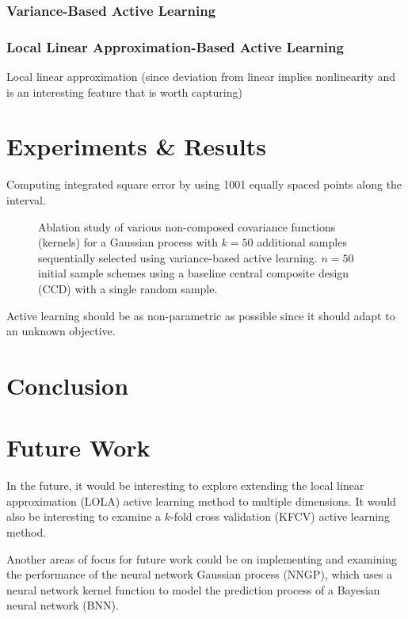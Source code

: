 \documentclass[conference]{IEEEtran}
\begin{document}
	\subsubsection{Variance-Based Active Learning}
	
	\subsubsection{Local Linear Approximation-Based Active Learning}
	Local linear approximation (since deviation from linear implies nonlinearity and is an interesting feature that is worth capturing)
	    
	\section{Experiments \& Results}
	\label{sec:experiments-results}
	
	Computing integrated square error by using 1001 equally spaced points along the interval.
	
	\begin{figure}[ht]
		\centering
		
		\caption{Ablation study of various non-composed covariance functions (kernels) for a Gaussian process with $k=50$ additional samples sequentially selected using variance-based active learning. $n=50$ initial sample schemes using a baseline central composite design (CCD) with a single random sample.}
	\end{figure}
	
	
	Active learning should be as non-parametric as possible since it should adapt to an unknown objective.
	
	\section{Conclusion}
	\label{sec:conclusion}
	
	
	\section{Future Work}
	\label{sec:future-work}
	
	In the future, it would be interesting to explore extending the local linear approximation (LOLA) active learning method to multiple dimensions. It would also be interesting to examine a $k$-fold cross validation (KFCV) active learning method.
	
	Another areas of focus for future work could be on implementing and examining the performance of the neural network Gaussian process (NNGP), which uses a neural network kernel function to model the prediction process of a Bayesian neural network (BNN).
	
\end{document}
